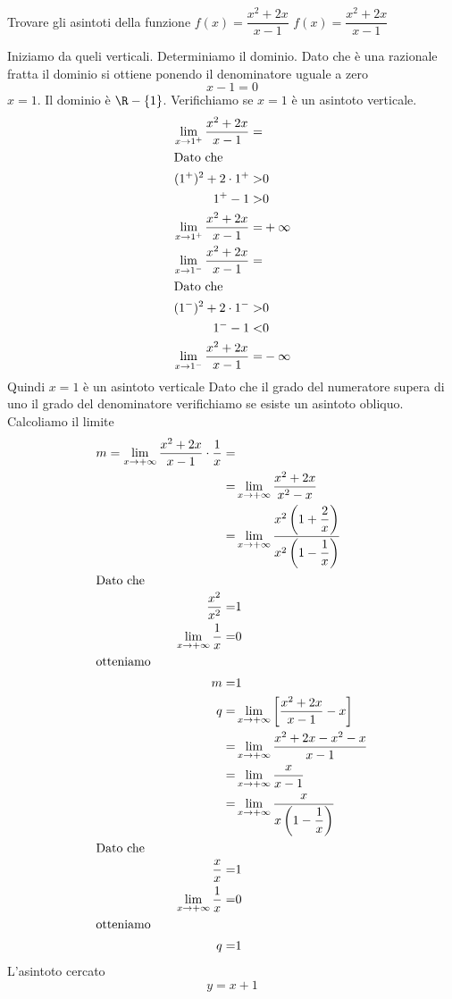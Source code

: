 \begin{exercise}
	Trovare gli asintoti della funzione $f(x)=\dfrac{x^2+2x}{x-1}$
	\tcblower
	$f(x)=\dfrac{x^2+2x}{x-1}$
		
Iniziamo da queli verticali. Determiniamo il dominio. Dato che è una razionale fratta il dominio si ottiene ponendo il denominatore uguale a zero\[x-1=0\] $x=1$. Il dominio è $\R-\lbrace1\rbrace$. Verifichiamo se $x=1$ è un asintoto verticale.
\begin{align*}
\lim_{x\to 1^+}\dfrac{x^2+2x}{x-1}=&\\
\intertext{Dato che}
(1^+)^2+2\cdot 1^+>&0\\
1^+-1>&0\\
\lim_{x\to 1^+}\dfrac{x^2+2x}{x-1}=&+\infty\\
\lim_{x\to 1^-}\dfrac{x^2+2x}{x-1}=&\\
\intertext{Dato che}
(1^-)^2+2\cdot 1^->&0\\
1^--1<&0\\
\lim_{x\to 1^-}\dfrac{x^2+2x}{x-1}=&-\infty\\
\end{align*}
Quindi $x=1$ è un asintoto verticale
Dato che il grado del numeratore supera di uno il grado del denominatore verifichiamo se esiste un asintoto obliquo. Calcoliamo il limite
\begin{align*}
m=\lim_{x\to +\infty}\dfrac{x^2+2x}{x-1}\cdot\dfrac{1}{x}=&\\
=&\lim_{x\to +\infty}\dfrac{x^2+2x}{x^2-x}\\
=&\lim_{x\to +\infty}\dfrac{x^2\left(1+\dfrac{2}{x}\right)}{x^2\left(1-\dfrac{1}{x}\right)}\\
\intertext{Dato che}
\dfrac{x^2}{x^2}=&1\\
\lim_{x\to +\infty}\dfrac{1}{x}=&0\\
\intertext{otteniamo}
m=&1\\
q=&\lim_{x\to +\infty}\left[\dfrac{x^2+2x}{x-1}-x\right]\\
=&\lim_{x\to +\infty}\dfrac{x^2+2x-x^2-x}{x-1}\\
=&\lim_{x\to +\infty}\dfrac{x}{x-1}\\
=&\lim_{x\to +\infty}\dfrac{x}{x\left(1-\dfrac{1}{x}\right)}\\
\intertext{Dato che}
\dfrac{x}{x}=&1\\
\lim_{x\to +\infty}\dfrac{1}{x}=&0\\
\intertext{otteniamo}
q=&1\\
\end{align*}
L'asintoto cercato\[y=x+1\]
\end{exercise}
